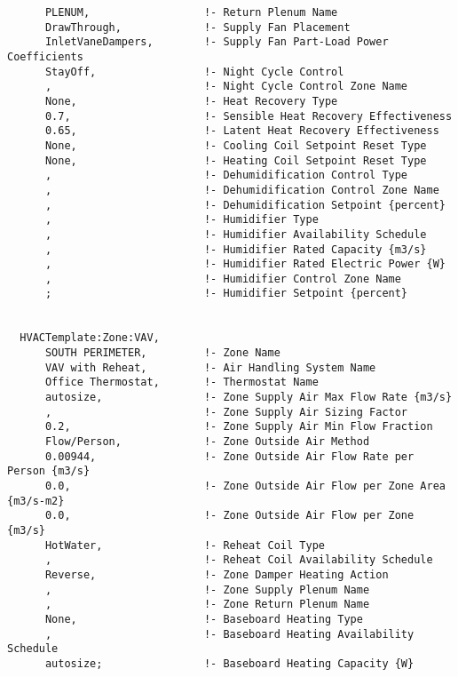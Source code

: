 \begin{lstlisting}
      PLENUM,                  !- Return Plenum Name
      DrawThrough,             !- Supply Fan Placement
      InletVaneDampers,        !- Supply Fan Part-Load Power Coefficients
      StayOff,                 !- Night Cycle Control
      ,                        !- Night Cycle Control Zone Name
      None,                    !- Heat Recovery Type
      0.7,                     !- Sensible Heat Recovery Effectiveness
      0.65,                    !- Latent Heat Recovery Effectiveness
      None,                    !- Cooling Coil Setpoint Reset Type
      None,                    !- Heating Coil Setpoint Reset Type
      ,                        !- Dehumidification Control Type
      ,                        !- Dehumidification Control Zone Name
      ,                        !- Dehumidification Setpoint {percent}
      ,                        !- Humidifier Type
      ,                        !- Humidifier Availability Schedule
      ,                        !- Humidifier Rated Capacity {m3/s}
      ,                        !- Humidifier Rated Electric Power {W}
      ,                        !- Humidifier Control Zone Name
      ;                        !- Humidifier Setpoint {percent}


  HVACTemplate:Zone:VAV,
      SOUTH PERIMETER,         !- Zone Name
      VAV with Reheat,         !- Air Handling System Name
      Office Thermostat,       !- Thermostat Name
      autosize,                !- Zone Supply Air Max Flow Rate {m3/s}
      ,                        !- Zone Supply Air Sizing Factor
      0.2,                     !- Zone Supply Air Min Flow Fraction
      Flow/Person,             !- Zone Outside Air Method
      0.00944,                 !- Zone Outside Air Flow Rate per Person {m3/s}
      0.0,                     !- Zone Outside Air Flow per Zone Area {m3/s-m2}
      0.0,                     !- Zone Outside Air Flow per Zone {m3/s}
      HotWater,                !- Reheat Coil Type
      ,                        !- Reheat Coil Availability Schedule
      Reverse,                 !- Zone Damper Heating Action
      ,                        !- Zone Supply Plenum Name
      ,                        !- Zone Return Plenum Name
      None,                    !- Baseboard Heating Type
      ,                        !- Baseboard Heating Availability Schedule
      autosize;                !- Baseboard Heating Capacity {W}



\end{lstlisting}

